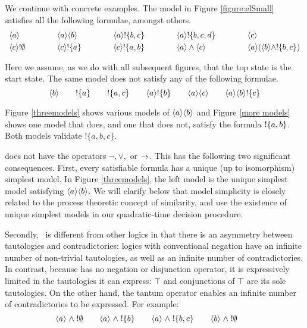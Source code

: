 We continue with concrete examples.  The model in Figure
\ref{figure:elSmall} satisfies all the following formulae, amongst
others.
\[
\begin{array}{lclclclcl}
\MAY{a} &\qquad&
\MAY{a} \MAY{b} &\qquad&
\MAY{a} \fBang \{b,c\} &\qquad&
\MAY{a} \fBang \{b,c,d\} &\qquad&
\MAY{c} \\[1mm]
\MAY{c} \fBang \emptyset &&
\MAY{c} \fBang \{a\} &&
\MAY{c} \fBang \{a,b\} &&
\MAY{a} \land \MAY{c} &&
\MAY{a} (\MAY{b} \land \fBang \{b,c\})
\end{array}
\]

\NI Here we assume, as we do with all subsequent figures, that the top
state is the start state.  The same model does not satisfy any of the
following formulae.
\[
\langle b \rangle \qquad
! \{a\} \qquad
! \{a, c\} \qquad
\langle a \rangle ! \{b\} \qquad
\langle a \rangle \langle c \rangle \qquad
\langle a \rangle \langle b \rangle ! \{c\} 
\]

\NI Figure \ref{threemodels} shows various models of $\MAY{a} \MAY{b}$
and Figure \ref{more models} shows one model that does, and one that
does not, satisfy the formula $! \{a,b\}$.  Both models validate
$!\{a, b, c\}$.

\Cathoristic{} does not have the operators $\neg, \lor, $ or
$\rightarrow$.  This has the following two significant consequences.
First, every satisfiable formula has a unique (up to isomorphism)
simplest model.  In Figure \ref{threemodels}, the left model is the
unique simplest model satisfying $\MAY{a} \MAY{b}$.  We will clarify
below that model simplicity is closely related to the process
theoretic concept of similarity, and use the existence of unique
simplest models in our quadratic-time decision procedure.





Secondly, \cathoristic\  is different from other logics in that there is an
asymmetry between tautologies and contradictories: logics with
conventional negation have an infinite number of non-trivial
tautologies, as well as an infinite number of contradictories.  In
contrast, because \cathoristic{} has no negation or disjunction
operator, it is expressively limited in the tautologies it can
express: $\top$ and conjunctions of $\top$ are its sole tautologies. On the
other hand, the tantum operator enables an infinite number of
contradictories to be expressed.  For example:
\[
   \langle a \rangle \;\land\; ! \emptyset \qquad
   \langle a \rangle \;\land\; ! \{b\} \qquad
   \langle a \rangle \;\land\; ! \{b, c\} \qquad
   \langle b \rangle \;\land\; ! \emptyset \qquad
\]


